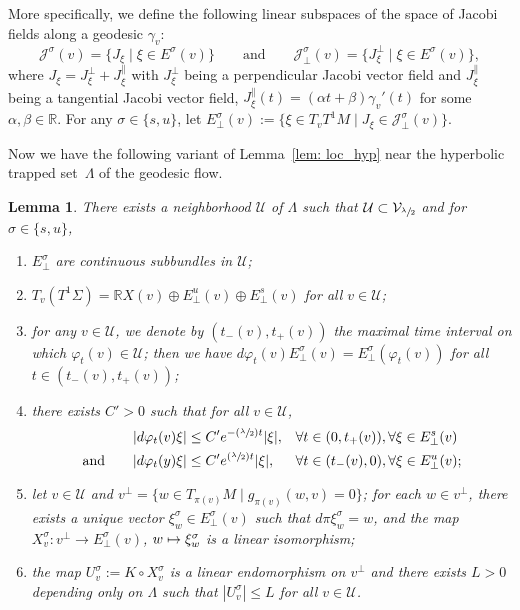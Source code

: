 \documentclass[10pt]{amsart}
\newcommand\mto{\mathchoice{\longmapsto}{\mapsto}{\mapsto}{\mapsto}}
\newcommand{\Psfrac}[2]{(\sfrac{#1}{#2})}
\let\sep\mid
\newtheorem{lemma}[theorem]{Lemma}
\theoremstyle{definition}
\let\phi\varphi
\renewcommand{\>}{{\rangle}}
\newcommand{\<}{{\langle}}
\begin{document}
More specifically, we define the following linear subspaces of the space of Jacobi fields along a geodesic $\gamma_v$:
\begin{equation*}
\mathcal J^{\sigma}(v) = \{J_\xi\sep \xi\in E^{\sigma}(v)\} \qquad\text{and} \qquad \mathcal J_{\bot}^{\sigma}(v) = \{J^{\bot}_\xi\sep \xi\in E^{\sigma}(v)\},
\end{equation*}
where $J_{\xi}=J^{\bot}_{\xi}+J^{\parallel}_{\xi}$ with $J^{\bot}_{\xi}$ being a perpendicular Jacobi vector field and $J^{\parallel}_{\xi}$ being a tangential Jacobi vector field, \ie $J^{\parallel}_{\xi}(t)=(\alpha t+\beta)\gamma_v'(t)$ for some $\alpha,\beta\in\mathbb R$. For any $\sigma\in\{s, u\}$, let $E^{\sigma}_{\bot}(v) := \{\xi\in T_vT^1M\sep  J_{\xi}\in\mathcal J^{\sigma}_{\bot}(v)\}$.

Now we have the following variant of Lemma~\ref{lem: loc_hyp} near the hyperbolic trapped set~$\Lambda$ of the geodesic flow.

\begin{lemma}\label{lem: perp_component}
There exists a neighborhood $\mathcal U$ of $\Lambda$ such that $\mathcal U\subset \mathcal V_{\sfrac{\lambda}{2}}$ and for $\sigma\in\{s, u\}$,
\begin{enumerate}
\item\label{cont_inv_bundle} $E^{\sigma}_{\bot}$ are continuous subbundles in $\mathcal U$;
\item $T_v(T^1\Sigma) = \mathbb RX(v)\oplus E^u_{\bot}(v)\oplus E^s_{\bot}(v)$ for all $v\in\mathcal U$;
\item for any $v\in\mathcal U$, we denote by $(t_{-}(v), t_{+}(v))$ the maximal time interval on which $\phi_t(v)\in \mathcal U$; then we have $d\phi_t(v)E_{\bot}^{\sigma}(v)=E^{\sigma}_{\bot}(\phi_t(v))$ for all $t\in(t_-(v),t_+(v))$;
\item\label{rate_for_perp} there exists $C'>0$ such that for all $v\in\mathcal U$,
\[
\begin{aligned}
|d\phi_t(v)\xi|&\leq C'e^{-\Psfrac{\lambda}{2}t}|\xi|, && \forall t\in(0,t_+(v)), \forall \xi\in E^s_{\perp}(v)\\
\text{and} \qquad |d\phi_t(y)\xi|&\leq C'e^{\Psfrac{\lambda}{2}t}|\xi|, && \forall t\in(t_-(v),0), \forall \xi\in E^u_{\perp}(v);
\end{aligned}
\]
\item\label{linear_isom} let $v\in \mathcal U$ and $v^{\bot} = \{w\in T_{\pi(v)}M\sep g_{\pi(v)}(w,v)=0\}$; for each $w\in v^{\bot}$, there exists a unique vector $\xi^{\sigma}_{w}\in E^{\sigma}_{\bot}(v)$ such that $d\pi\xi^{\sigma}_w=w$, and the map $X^{\sigma}_v: v^{\bot}\to E^{\sigma}_{\bot}(v)$, $w\mto \xi^{\sigma}_w$ is a linear isomorphism;

\item\label{norm_bound_in_U} the map $U^{\sigma}_v:=K\circ X^{\sigma}_v$ is a linear endomorphism on $v^{\bot}$ and there exists $L>0$ depending only on $\Lambda$ such that $|U^{\sigma}_v|\leq L$ for all $v\in \mathcal U$.
\end{enumerate}
\end{lemma}
\end{document}
